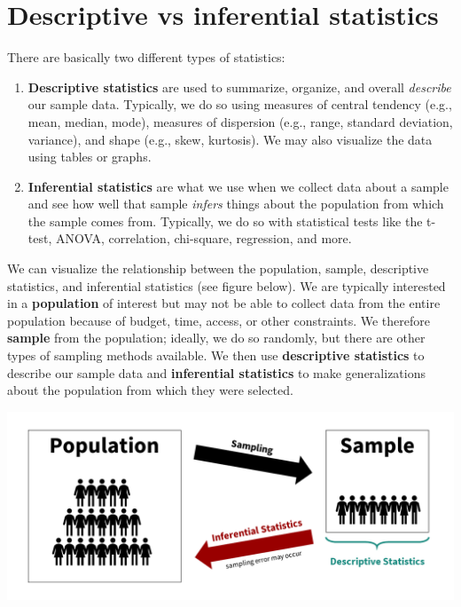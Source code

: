 \documentclass[
]{book}
\begin{document}
\hypertarget{descriptive-vs-inferential-statistics}{%
\section{Descriptive vs inferential statistics}\label{descriptive-vs-inferential-statistics}}

There are basically two different types of statistics:

\begin{enumerate}
\def\labelenumi{\arabic{enumi}.}
\item
  \textbf{Descriptive statistics} are used to summarize, organize, and overall \emph{describe} our sample data. Typically, we do so using measures of central tendency (e.g., mean, median, mode), measures of dispersion (e.g., range, standard deviation, variance), and shape (e.g., skew, kurtosis). We may also visualize the data using tables or graphs.
\item
  \textbf{Inferential statistics} are what we use when we collect data about a sample and see how well that sample \emph{infers} things about the population from which the sample comes from. Typically, we do so with statistical tests like the t-test, ANOVA, correlation, chi-square, regression, and more.
\end{enumerate}

We can visualize the relationship between the population, sample, descriptive statistics, and inferential statistics (see figure below). We are typically interested in a \textbf{population} of interest but may not be able to collect data from the entire population because of budget, time, access, or other constraints. We therefore \textbf{sample} from the population; ideally, we do so randomly, but there are other types of sampling methods available. We then use \textbf{descriptive statistics} to describe our sample data and \textbf{inferential statistics} to make generalizations about the population from which they were selected.

\includegraphics{images/02-stats-foundations/descriptive-vs-inferential.png}
\end{document}
